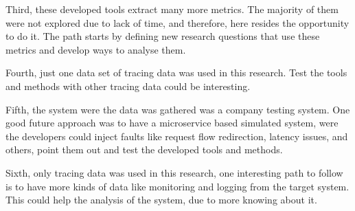 Third, these developed tools extract many more metrics. The majority of them were not explored due to lack of time, and therefore, here resides the opportunity to do it. The path starts by defining new research questions that use these metrics and develop ways to analyse them.

Fourth, just one data set of tracing data was used in this research. Test the tools and methods with other tracing data could be interesting.

Fifth, the system were the data was gathered was a company testing system. One good future approach was to have a microservice based simulated system, were the developers could inject faults like request flow redirection, latency issues, and others, point them out and test the developed tools and methods.

Sixth, only tracing data was used in this research, one interesting path to follow is to have more kinds of data like monitoring and logging from the target system. This could help the analysis of the system, due to more knowing about it.

\checkoddpage
{}
{ %
\newpage
\blankpage}
{ %
}